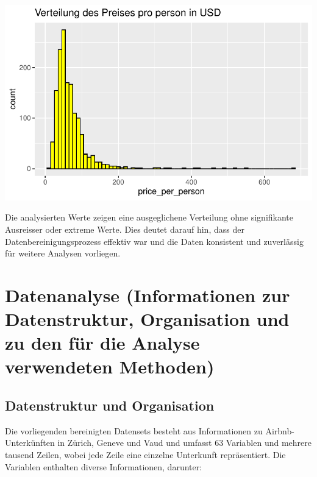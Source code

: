 \documentclass[
  journal,
]{IEEEtran}%
\begin{document}
\includegraphics{main_files/figure-pdf/eda price_per_person-1.pdf}

Die analysierten Werte zeigen eine ausgeglichene Verteilung ohne
signifikante Ausreisser oder extreme Werte. Dies deutet darauf hin, dass
der Datenbereinigungsprozess effektiv war und die Daten konsistent und
zuverlässig für weitere Analysen vorliegen.

\hypertarget{datenanalyse-informationen-zur-datenstruktur-organisation-und-zu-den-fuxfcr-die-analyse-verwendeten-methoden}{%
\section{Datenanalyse (Informationen zur Datenstruktur, Organisation und
zu den für die Analyse verwendeten
Methoden)}\label{datenanalyse-informationen-zur-datenstruktur-organisation-und-zu-den-fuxfcr-die-analyse-verwendeten-methoden}}

\hypertarget{datenstruktur-und-organisation}{%
\subsection{Datenstruktur und
Organisation}\label{datenstruktur-und-organisation}}

Die vorliegenden bereinigten Datensets besteht aus Informationen zu
Airbnb-Unterkünften in Zürich, Geneve und Vaud und umfasst 63 Variablen
und mehrere tausend Zeilen, wobei jede Zeile eine einzelne Unterkunft
repräsentiert. Die Variablen enthalten diverse Informationen, darunter:
\end{document}
